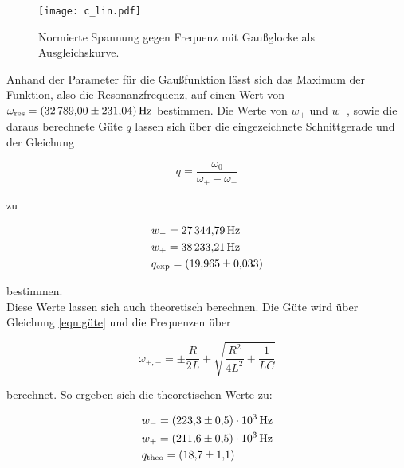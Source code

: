 \begin{figure}[H]
    \texttt{[image: c\_lin.pdf]}
    \caption{Normierte Spannung gegen Frequenz mit Gaußglocke als Ausgleichskurve.}
\end{figure}

\noindent Anhand der Parameter für die Gaußfunktion lässt sich das Maximum der Funktion, also die Resonanzfrequenz, auf einen Wert von 
$\omega_\text{res} = \qty{32789.00 \pm 231.04}{\hertz}$ bestimmen.
Die Werte von $w_+$ und $w_-$, sowie die daraus berechnete Güte $q$ lassen sich über die eingezeichnete Schnittgerade und der Gleichung

\begin{equation*}
    q = \frac{\omega_0}{\omega_+ - \omega_-}
\end{equation*}

\noindent zu 

\begin{align}
    &w_- = \qty{27344.79}{\hertz} \\
    &w_+ = \qty{38233.21}{\hertz} \\
    &q_\text{exp}   = \qty{19.965 \pm 0.033}{}
\end{align}

\noindent bestimmen. \\
\noindent Diese Werte lassen sich auch theoretisch berechnen. Die Güte wird über Gleichung \eqref{eqn:güte} und die Frequenzen über

\begin{equation*}
    \omega_{+,-}= \pm \frac{R}{2L} + \sqrt{\frac{R^2}{4L^2} +\frac{1}{LC}}
\end{equation*}

berechnet. So ergeben sich die theoretischen Werte zu:

\begin{align}
    &w_- = \qty{223.3 \pm 0.5 e3}{\hertz} \\
    &w_+ = \qty{211.6 \pm 0.5 e3}{\hertz} \\
    &q_\text{theo} = \qty{18.7 \pm 1.1}{}
\end{align}


%
